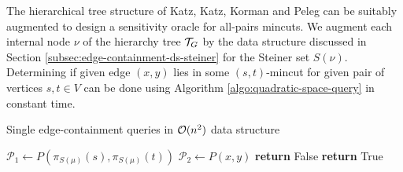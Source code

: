 The hierarchical tree structure of Katz, Katz, Korman and Peleg \cite{DBLP:journals/siamcomp/KatzKKP04} can be suitably augmented to design a sensitivity oracle for all-pairs mincuts. We augment each internal node $\nu$ of the hierarchy tree ${\cal T}_G$ by the data structure discussed in Section \ref{subsec:edge-containment-ds-steiner} for the Steiner set $S(\nu)$. Determining if given edge $(x,y)$ lies in some $(s,t)$-mincut for given pair of vertices $s,t\in V$ can be done using Algorithm \ref{algo:quadratic-space-query} in constant time. 

\begin{algorithm}%
    \caption{Single edge-containment queries in ${\cal O}(n^2)$ data structure}
    \label{algo:quadratic-space-query}
    \begin{algorithmic}[1] %
            \State $\mathcal P_1 \gets P(\pi_{S(\mu)}(s),\pi_{S(\mu)}(t))$
            \State $\mathcal P_2 \gets P(x,y)$
              
            \State \textbf{return} False
            \Else 
            \State \textbf{ return} True
            \EndIf
        \EndProcedure
    \end{algorithmic}
\end{algorithm}






